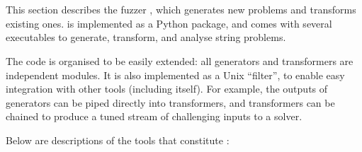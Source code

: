 \section{\fuzzer{}}

    This section describes the fuzzer \fuzzer{}, which generates new \smt{} problems and transforms existing ones. \fuzzer{} is implemented as a Python package, and comes with several executables to generate, transform, and analyse \smt{} string problems.


    The \fuzzer{} code is organised to be easily extended: all generators and transformers are independent modules. It is also implemented as a Unix ``filter'', to enable easy integration with other tools (including itself). For example, the outputs of generators can be piped directly into transformers, and transformers can be chained to produce a tuned stream of challenging inputs to a solver.

    Below are descriptions of the tools that constitute \fuzzer{}:

